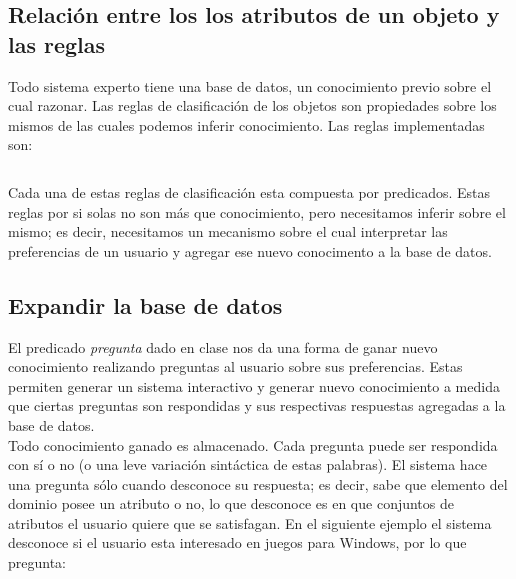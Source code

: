 \documentclass[11pt,oneside,a4paper]{article}
\begin{document}
\subsection{Relación entre los los atributos de un objeto y las reglas}


Todo sistema experto tiene una base de datos, un conocimiento previo sobre el
cual razonar. Las reglas de clasificación de los objetos son propiedades
sobre los mismos de las cuales podemos inferir conocimiento. Las reglas 
implementadas son:

\inputminted[firstline=17, lastline=31, fontsize=\footnotesize]{prolog}{tp-prolog.pl}

Cada una de estas reglas de clasificación esta compuesta por predicados.
Estas reglas por si solas no son más que conocimiento, pero necesitamos inferir 
sobre el mismo; es decir, necesitamos un mecanismo sobre el cual interpretar las preferencias 
de un usuario y agregar ese nuevo conocimento a la base de datos.

\subsection{Expandir la base de datos}

El predicado \emph{pregunta} dado en clase nos da una forma de ganar nuevo conocimiento
realizando preguntas al usuario sobre sus preferencias.
Estas permiten generar un sistema interactivo y generar nuevo %
conocimiento a medida que ciertas preguntas son respondidas y sus respectivas respuestas
agregadas a la base de datos.\\



Todo conocimiento ganado es almacenado.
Cada pregunta puede ser respondida con sí o no (o una leve variación 
sintáctica de estas palabras). El sistema hace una pregunta 
sólo cuando desconoce su respuesta; es decir, sabe que elemento del dominio 
posee un atributo o no, lo que desconoce es en que conjuntos de atributos 
el usuario quiere que se satisfagan. En el siguiente ejemplo el 
sistema desconoce si el usuario esta interesado en juegos para Windows, por lo
que pregunta:
\end{document}
